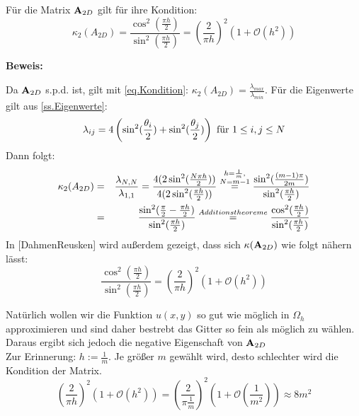 Für die Matrix ${\textbf{A}}_{2D}$ gilt für ihre Kondition:
\begin{equation}
\kappa_{2} (A_{2D}) = \frac {\cos^{2}(\frac{\pi h}{2})} {\sin^{2}(\frac{\pi h}{2})} = \left( \frac {2} {\pi h} \right)^{2} (1 + \mathcal{O}(h^{2}))
\end{equation}

\textbf{Beweis:}

Da ${\textbf{A}}_{2D}$ s.p.d. ist, gilt mit \autoref{eq.Kondition}: $\kappa_{2} (A_{2D}) = \frac {\lambda_{max}} {\lambda_{min}}$. Für die Eigenwerte gilt aus \autoref{ss.Eigenwerte}:
\begin{equation}
\lambda_{ij} = 4 \left(\sin^{2}(\frac {\theta_{i}} {2}) + \sin^{2}(\frac {\theta_{j}} {2}) \right) \textnormal{ für } 1 \le i,j \le N \notag
\end{equation}
Dann folgt:
\begin{eqnarray}
\kappa_{2} (A_{2D}) &=& \frac {\lambda_{N,N}} {\lambda_{1,1}} = \frac {4(2\sin^{2}(\frac {N \pi h} {2}))} {4(2\sin^{2}(\frac {\pi h} {2}))} \overset{\substack{h=\frac {1} {m}, \\ N=m-1}}{=} \frac {\sin^{2}(\frac {(m-1) \pi} {2m})} {\sin^{2}(\frac {\pi h} {2})} \notag \\
&=& \frac {\sin^{2} (\frac {\pi} {2} - \frac {\pi h} {2})} {\sin^{2} (\frac {\pi h} {2})} \overset{Additionstheoreme}{=} \frac {\cos^{2} (\frac {\pi h} {2})} {\sin^{2} (\frac {\pi h} {2})} \notag
\end{eqnarray}
In [DahmenReusken] wird außerdem gezeigt, dass sich $\kappa({\textbf{A}}_{2D})$ wie folgt nähern lässt:
\begin{equation}
\frac {\cos^{2} (\frac {\pi h} {2})} {\sin^{2} (\frac {\pi h} {2})} = \left( \frac {2} {\pi h} \right)^{2} (1 + \mathcal{O}(h^{2}))
\end{equation}

Natürlich wollen wir die Funktion $u(x,y)$ so gut wie möglich in $\Omega_{h}$ approximieren und sind daher bestrebt das Gitter so fein als möglich zu wählen. Daraus ergibt sich jedoch die negative Eigenschaft von ${\textbf{A}}_{2D}$ \\
Zur Erinnerung: $h := \frac {1} {m}$. Je größer $m$ gewählt wird, desto schlechter wird die Kondition der Matrix.
\begin{equation}
\left( \frac {2} {\pi h} \right)^{2} (1 + \mathcal{O}(h^{2})) = \left( \frac {2} {\pi \frac {1} {m}} \right)^{2} (1 + \mathcal{O}(\frac {1} {m^{2}})) \approx 8 m ^{2}
\end{equation}

